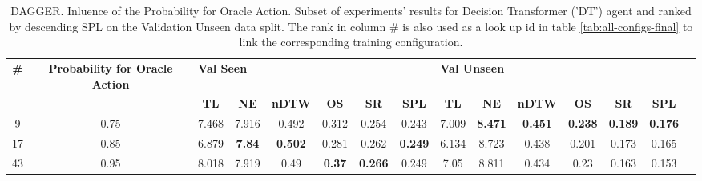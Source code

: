 \begin{table}
\centering
\caption{\label{tab:dt_dagger_prob}DAGGER. Inluence of the Probability for Oracle Action. Subset of experiments' results for Decision Transformer ('DT') agent and ranked by descending SPL on the Validation Unseen data split. The rank in column \# is also used as a look up id in table \ref{tab:all-configs-final} to link the corresponding training configuration.}
\begin{tabular}{@{\hskip3pt}c@{\hskip3pt}c@{\hskip3pt}c@{\hskip3pt}c@{\hskip3pt}c@{\hskip3pt}c@{\hskip3pt}c@{\hskip3pt}c@{\hskip3pt}c@{\hskip3pt}c@{\hskip3pt}c@{\hskip3pt}c@{\hskip3pt}c@{\hskip3pt}c@{\hskip3pt}c}
\toprule
\textbf{\#} & \textbf{Probability for Oracle Action} & \multicolumn{6}{l}{\textbf{Val Seen}} & \multicolumn{6}{l}{\textbf{Val Unseen}} \\
 \textbf{~} &                             \textbf{~} &       \textbf{TL} &    \textbf{NE} &   \textbf{nDTW} &    \textbf{OS} &     \textbf{SR} &    \textbf{SPL} &         \textbf{TL} &     \textbf{NE} &   \textbf{nDTW} &     \textbf{OS} &     \textbf{SR} &    \textbf{SPL} \\
\midrule
          9 &                                   0.75 &             7.468 &          7.916 &           0.492 &          0.312 &           0.254 &           0.243 &               7.009 &  \textbf{8.471} &  \textbf{0.451} &  \textbf{0.238} &  \textbf{0.189} &  \textbf{0.176} \\
         17 &                                   0.85 &             6.879 &  \textbf{7.84} &  \textbf{0.502} &          0.281 &           0.262 &  \textbf{0.249} &               6.134 &           8.723 &           0.438 &           0.201 &           0.173 &           0.165 \\
         43 &                                   0.95 &             8.018 &          7.919 &            0.49 &  \textbf{0.37} &  \textbf{0.266} &           0.249 &                7.05 &           8.811 &           0.434 &            0.23 &           0.163 &           0.153 \\
\bottomrule
\end{tabular}
\end{table}
